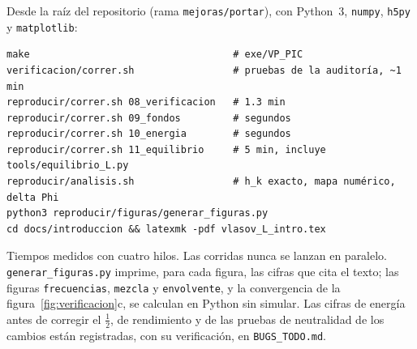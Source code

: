 \documentclass[11pt,a4paper]{article}
\begin{document}
Desde la raíz del repositorio (rama \texttt{mejoras/portar}), con Python~3,
\texttt{numpy}, \texttt{h5py} y \texttt{matplotlib}:

\begin{verbatim}
make                                   # exe/VP_PIC
verificacion/correr.sh                 # pruebas de la auditoría, ~1 min
reproducir/correr.sh 08_verificacion   # 1.3 min
reproducir/correr.sh 09_fondos         # segundos
reproducir/correr.sh 10_energia        # segundos
reproducir/correr.sh 11_equilibrio     # 5 min, incluye tools/equilibrio_L.py
reproducir/analisis.sh                 # h_k exacto, mapa numérico, delta Phi
python3 reproducir/figuras/generar_figuras.py
cd docs/introduccion && latexmk -pdf vlasov_L_intro.tex
\end{verbatim}

Tiempos medidos con cuatro hilos. Las corridas nunca se lanzan en paralelo.
\texttt{generar\_figuras.py} imprime, para cada figura, las cifras que cita el texto; las
figuras \texttt{frecuencias}, \texttt{mezcla} y \texttt{envolvente}, y la convergencia de la
figura~\ref{fig:verificacion}c, se calculan en Python sin simular. Las cifras de energía
antes de corregir el $\tfrac12$, de rendimiento y de las pruebas de neutralidad de los
cambios están registradas, con su verificación, en \texttt{BUGS\_TODO.md}.
\end{document}
